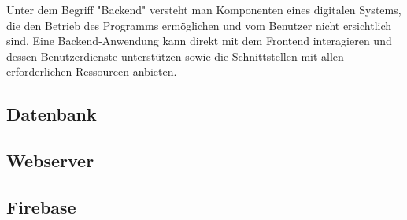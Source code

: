 Unter dem Begriff "Backend" versteht man Komponenten eines digitalen Systems, die den Betrieb des Programms ermöglichen und vom Benutzer nicht ersichtlich sind.
\newline
Eine Backend-Anwendung kann direkt mit dem Frontend interagieren und dessen Benutzerdienste unterstützen sowie die Schnittstellen mit allen erforderlichen Ressourcen anbieten.

\subsection{Datenbank}


\subsection{Webserver}




\subsection{Firebase}
